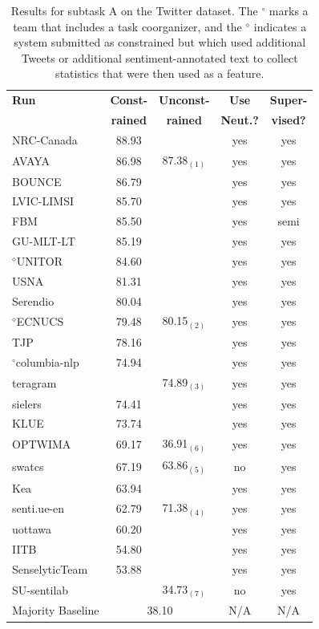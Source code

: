 \begin{table}[hbt]
    \centering
    \begin{small}
    \begin{tabular}{@{ }lc@{ }c@{ }cc@{ }}
    \bf Run & \bf Const- & \bf Unconst- & \bf Use & \bf Super-\\
    & \bf rained & \bf rained & \bf Neut.? & \bf vised?\\
    \hline
    NRC-Canada & 88.93 &  & yes & yes\\
    AVAYA & 86.98 & 87.38$_{(1)}$ & yes & yes\\
    BOUNCE & 86.79 &  & yes & yes\\
    LVIC-LIMSI & 85.70 &  & yes & yes\\
    FBM & 85.50 &  & yes & semi\\
    GU-MLT-LT & 85.19 &  & yes & yes\\
    $^\diamond$UNITOR & 84.60 &  & yes & yes\\
    USNA & 81.31 &  & yes & yes\\
    Serendio & 80.04 &  & yes & yes\\
    $^\diamond$ECNUCS & 79.48 & 80.15$_{(2)}$ & yes & yes\\
    TJP & 78.16 &  & yes & yes\\
    $^\circ$columbia-nlp & 74.94 &  & yes & yes\\
    teragram &  & 74.89$_{(3)}$ & yes & yes\\
    sielers & 74.41 &  & yes & yes\\
    KLUE & 73.74 &  & yes & yes\\
    OPTWIMA & 69.17 & 36.91$_{(6)}$ & yes & yes\\
    swatcs & 67.19 & 63.86$_{(5)}$ & no & yes\\
    Kea & 63.94 &  & yes & yes\\
    senti.ue-en & 62.79 & 71.38$_{(4)}$ & yes & yes\\
    uottawa & 60.20 &  & yes & yes\\
    IITB & 54.80 &  & yes & yes\\
    SenselyticTeam & 53.88 &  & yes & yes\\
    SU-sentilab &  & 34.73$_{(7)}$ & no & yes\\
        \hline
    Majority Baseline & \multicolumn{2}{c}{38.10} & N/A & N/A \\
    \hline
    \end{tabular}
    \end{small}
    \caption{\label{tab:TaskATwitter}Results for subtask A on the Twitter dataset.
             The $^\circ$ marks a team that includes a task coorganizer,
             and the $^\diamond$ indicates a system submitted as constrained but which used additional Tweets or additional sentiment-annotated text
             to collect statistics that were then used as a feature.}
  \end{table}


